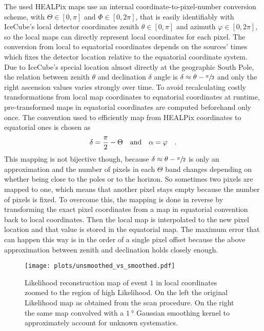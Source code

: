 The used HEALPix maps use an internal coordinate-to-pixel-number conversion scheme, with $\Theta\in[0, \pi]$ and $\Phi\in[0, 2\pi]$, that is easily identifiably with IceCube's local detector coordinates zenith $\theta\in[0, \pi]$ and azimuth $\varphi\in[0, 2\pi]$, so the local maps can directly represent local coordinates for each pixel.
The conversion from local to equatorial coordinates depends on the sources' times which fixes the detector location relative to the equatorial coordinate system.
Due to IceCube's special location almost directly at the geographic South Pole, the relation between zenith $\theta$ and declination $\delta$ angle is $\delta \approx \theta - \sfrac{\pi}{2}$ and only the right ascension values varies strongly over time.
To avoid recalculating costly transformations from local map coordinates to equatorial coordinates at runtime, pre-transformed maps in equatorial coordinates are computed beforehand only once.
The convention used to efficiently map from HEALPix coordinates to equatorial ones is chosen as
\begin{equation}
  \delta = \frac{\pi}{2} - \Theta \quad\text{and}\quad \alpha = \varphi
  \quad\text{.}
\end{equation}
This mapping is not bijective though, because $\delta \approx \theta - \sfrac{\pi}{2}$ is only an approximation and the number of pixels in each $\Theta$ band changes depending on whether being close to the poles or to the horizon.
So sometimes two pixels are mapped to one, which means that another pixel stays empty because the number of pixels is fixed.
To overcome this, the mapping is done in reverse by transforming the exact pixel coordinates from a map in equatorial convention back to local coordinates.
Then the local map is interpolated to the new pixel location and that value is stored in the equatorial map.
The maximum error that can happen this way is in the order of a single pixel offset because the above approximation between zenith and declination holds closely enough.

\begin{figure}[htbp]
  \centering
  \texttt{[image: plots/unsmoothed\_vs\_smoothed.pdf]}
  \caption[Likelihood reconstruction map before and after smoothing]{
    Likelihood reconstruction map of event $1$ in local coordinates zoomed to the region of high Likelihood.
    On the left the original Likelihood map as obtained from the scan procedure.
    On the right the same map convolved with a $\SI{1}{\degree}$ Gaussian smoothing kernel to approximately account for unknown systematics.
  }
  \label{fig:unsmoothed_vs_smoothed}
\end{figure}

